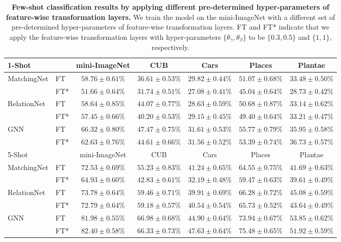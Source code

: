 \begin{table}[t]\scriptsize
	\centering
	\caption{\textbf{Few-shot classification results by applying different pre-determined hyper-parameters of feature-wise transformation layers.} We train the model on the mini-ImageNet with a different set of pre-determined hyper-parameters of feature-wise transformation layers. FT and FT* indicate that we apply the feature-wise transformation layers with hyper-parameters $\{\theta_\gamma,\theta_\beta\}$ to be $\{0.3,0.5\}$ and $\{1,1\}$, respectively.}
	\begin{tabular}{@{}ll|c|cccc@{}} 
	    \toprule
	    1-Shot & & mini-ImageNet & CUB & Cars & Places & Plantae \\
		\midrule
		MatchingNet & FT &
		$58.76 \pm 0.61\%$ & $36.61 \pm 0.53\%$ & $29.82 \pm 0.44\%$ & $51.07 \pm 0.68\%$ & $33.48 \pm 0.50\%$\\
		& FT* & 
$51.66 \pm 0.64\%$ & $31.74 \pm 0.51\%$ & $27.08 \pm 0.41\%$ & $45.04 \pm 0.64\%$ & $28.73 \pm 0.42\%$\\
		\midrule
		RelationNet & FT & 
		$58.64 \pm 0.85\%$ & $44.07 \pm 0.77\%$ & $28.63 \pm 0.59\%$ & $50.68 \pm 0.87\%$ & $33.14 \pm 0.62\%$\\
		& FT* & 
	    $57.45 \pm 0.66\%$ & $40.20 \pm 0.53\%$ & $29.15 \pm 0.45\%$ & $49.40 \pm 0.64\%$ & $33.21 \pm 0.47\%$\\
		\midrule
		GNN & FT &
		$66.32 \pm 0.80\%$ & $47.47 \pm 0.75\%$ & $31.61 \pm 0.53\%$ & $55.77 \pm 0.79\%$ & $35.95 \pm 0.58\%$\\
		& FT* & 
		$62.63 \pm 0.76\%$ & $44.61 \pm 0.66\%$ & $31.56 \pm 0.52\%$ & $53.39 \pm 0.74\%$ & $36.73 \pm 0.57\%$\\
	    \midrule
	    \midrule
		5-Shot & & mini-ImageNet & CUB & Cars & Places & Plantae \\
		\midrule
		MatchingNet & FT &
		$72.53 \pm 0.69\%$ & $55.23 \pm 0.83\%$ & $41.24 \pm 0.65\%$ & $64.55 \pm 0.75\%$ & $41.69 \pm 0.63\%$\\
		& FT* & 
		$64.93 \pm 0.60\%$ & $42.83 \pm 0.61\%$ & $32.19 \pm 0.48\%$ & $59.47 \pm 0.63\%$ & $39.61 \pm 0.49\%$\\
		\midrule
		RelationNet & FT &
		$73.78 \pm 0.64\%$ & $59.46 \pm 0.71\%$ & $39.91 \pm 0.69\%$ & $66.28 \pm 0.72\%$ & $45.08 \pm 0.59\%$\\
		& FT* & 
	    $72.79 \pm 0.64\%$ & $59.18 \pm 0.57\%$ & $40.54 \pm 0.54\%$ & $65.73 \pm 0.52\%$ & $43.64 \pm 0.49\%$\\
		\midrule
		GNN & FT &
		$81.98 \pm 0.55\%$ & $66.98 \pm 0.68\%$ & $44.90 \pm 0.64\%$ & $73.94 \pm 0.67\%$ & $53.85 \pm 0.62\%$\\
		& FT* & 
		$82.40 \pm 0.58\%$ & $66.33 \pm 0.73\%$ & $47.63 \pm 0.64\%$ & $75.48 \pm 0.65\%$ & $51.92 \pm 0.59\%$\\
		\bottomrule 
	\end{tabular}
	\label{tab:handtune}
\end{table}

